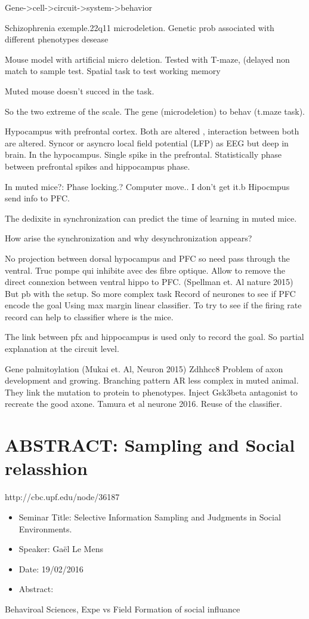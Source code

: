 \documentclass[10pt,letterpaper]{article}
\begin{document}
Gene->cell->circuit->system->behavior

Schizophrenia exemple.22q11 microdeletion.
Genetic prob associated with different phenotypes desease

Mouse model with artificial micro deletion. Tested with T-maze, (delayed non match to sample test. Spatial task to test working memory

Muted mouse doesn't succed in the task.

So the two extreme of the scale. The gene (microdeletion) to behav (t.maze task).

Hypocampus with prefrontal cortex. Both are altered , interaction between both are altered.
Syncor or asyncro local field potential (LFP) as EEG but deep in brain. In the hypocampus. Single spike in the prefrontal.
Statistically phase between prefrontal spikes and hippocampus phase.

In muted mice?:
Phase locking.? Computer move.. I don't get it.b
Hipocmpus send info to PFC.

The dedixite in synchronization can predict the time of learning in muted mice.

How arise the synchronization and why desynchronization appears?

No projection between dorsal hypocampus and PFC so need pass through the ventral. Truc pompe qui inhibite avec des fibre optique.
Allow to remove the direct connexion between ventral hippo to PFC. (Spellman et. Al nature 2015)
But pb with the setup.
So more complex task
Record of neurones to see if PFC encode the goal
Using max margin linear classifier. To try to see if the firing rate record can help to classifier where is the mice.

The link between pfx and hippocampus is used only to record the goal. So partial explanation at the circuit level.

Gene palmitoylation (Mukai et. Al, Neuron 2015)
Zdhhcc8
Problem of axon development and growing. Branching pattern AR less complex in muted animal. They link the mutation to protein to phenotypes.
Inject Gsk3beta antagonist to recreate the good axone. Tamura et al neurone 2016.
Reuse of the classifier. 


\section{ABSTRACT: Sampling and Social relasshion}
http://cbc.upf.edu/node/36187
\begin{itemize}
    \item Seminar Title: Selective Information Sampling and Judgments in Social Environments.
    \item Speaker: Gaël Le Mens
    \item Date: 19/02/2016
    \item Abstract:
\end{itemize}
Behaviroal Sciences, Expe vs Field
Formation of social influance
\end{document}
